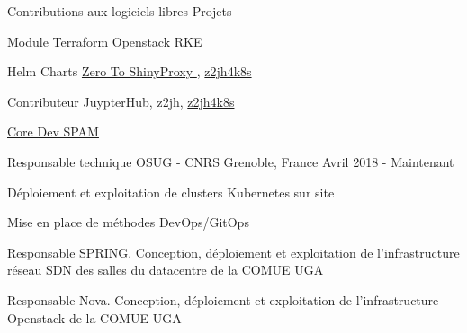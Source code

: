 

\begin{cventries}

  \cventry
    {Contributions aux logiciels libres} %
    {Projets}
    {}
    {}
    {
      \begin{cvitems} %
        \item {\href{https://github.com/remche/terraform-openstack-rke}{Module Terraform Openstack RKE \faGithub}}
        \item {Helm Charts \href{https://github.com/remche/zero-to-shinyproxy}{Zero To ShinyProxy \faGithub}, \href{https://github.com/remche/z2jh4k8s}{z2jh4k8s \faGithub}}
        \item {Contributeur JuypterHub, z2jh, \href{https://github.com/remche/z2jh4k8s}{z2jh4k8s \faGithub}}
        \item {\href{https://ttk.gricad-pages.univ-grenoble-alpes.fr/spam/intro.html}{Core Dev SPAM \faGlobe}}
      \end{cvitems}
    }

  \cventry
    {Responsable technique} %
    {OSUG - CNRS} %
    {Grenoble, France} %
    {Avril 2018 - Maintenant} %
    {
      \begin{cvitems} %
        \item {Déploiement et exploitation de clusters Kubernetes sur site}
        \item {Mise en place de méthodes DevOps/GitOps}
        \item {Responsable SPRING. Conception, déploiement et exploitation de l'infrastructure réseau SDN des salles du datacentre de la COMUE UGA}
        \item {Responsable Nova. Conception, déploiement et exploitation de l'infrastructure Openstack de la COMUE UGA}
      \end{cvitems}
    }


\end{cventries}
